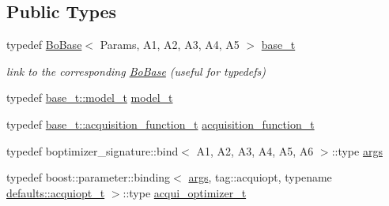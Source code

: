 \subsection*{Public Types}
\begin{DoxyCompactItemize}
\item 
typedef \hyperlink{classlimbo_1_1bayes__opt_1_1_bo_base}{Bo\+Base}$<$ Params, A1, A2, A3, A4, A5 $>$ \hyperlink{classlimbo_1_1bayes__opt_1_1_b_optimizer_a89d1cce7fdecc3598db103e337d942de}{base\+\_\+t}
\begin{DoxyCompactList}\small\item\em link to the corresponding \hyperlink{classlimbo_1_1bayes__opt_1_1_bo_base}{Bo\+Base} (useful for typedefs) \end{DoxyCompactList}\item 
typedef \hyperlink{classlimbo_1_1bayes__opt_1_1_bo_base_a1ddc93cc023a2d7d527deb4cc750624e}{base\+\_\+t\+::model\+\_\+t} \hyperlink{classlimbo_1_1bayes__opt_1_1_b_optimizer_aaddb85f5014ba377c9e2e3a64db87678}{model\+\_\+t}
\item 
typedef \hyperlink{classlimbo_1_1bayes__opt_1_1_bo_base_a02b14991b62e0f8c9bcf834220ed62e4}{base\+\_\+t\+::acquisition\+\_\+function\+\_\+t} \hyperlink{classlimbo_1_1bayes__opt_1_1_b_optimizer_ae0a407a5eba370a6a30acda501cd4ddc}{acquisition\+\_\+function\+\_\+t}
\item 
typedef boptimizer\+\_\+signature\+::bind$<$ A1, A2, A3, A4, A5, A6 $>$\+::type \hyperlink{classlimbo_1_1bayes__opt_1_1_b_optimizer_afd4c6a7d361de59fac5aa3a332ea0149}{args}
\item 
typedef boost\+::parameter\+::binding$<$ \hyperlink{classlimbo_1_1bayes__opt_1_1_bo_base_a75c1ae9e7268016c6f767c56bcede7d2}{args}, tag\+::acquiopt, typename \hyperlink{structlimbo_1_1bayes__opt_1_1_b_optimizer_1_1defaults_a4eb44d2abad01f5ef0206b7c5c595c7b}{defaults\+::acquiopt\+\_\+t} $>$\+::type \hyperlink{classlimbo_1_1bayes__opt_1_1_b_optimizer_a18dc1b593c859b8f89450a31f80fb592}{acqui\+\_\+optimizer\+\_\+t}
\end{DoxyCompactItemize}
